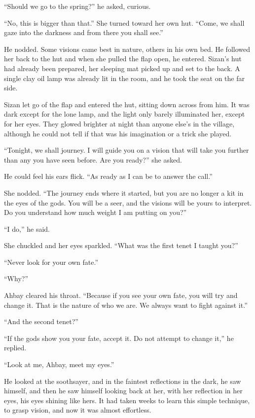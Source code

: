 ``Should we go to the spring?'' he asked, curious.

``No, this is bigger than that.'' She turned toward her own hut. ``Come, we shall gaze into the darkness and from there you shall see.''

He nodded. Some visions came best in nature, others in his own bed. He followed her back to the hut and when she pulled the flap open, he entered. Sizan's hut had already been prepared, her sleeping mat picked up and set to the back. A single clay oil lamp was already lit in the room, and he took the seat on the far side.

Sizan let go of the flap and entered the hut, sitting down across from him. It was dark except for the lone lamp, and the light only barely illuminated her, except for her eyes. They glowed brighter at night than anyone else's in the village, although he could not tell if that was his imagination or a trick she played.

``Tonight, we shall journey. I will guide you on a vision that will take you further than any you have seen before. Are you ready?'' she asked.

He could feel his ears flick. ``As ready as I can be to answer the call.''

She nodded. ``The journey ends where it started, but you are no longer a kit in the eyes of the gods. You will be a seer, and the visions will be yours to interpret. Do you understand how much weight I am putting on you?''

``I do,'' he said.

She chuckled and her eyes sparkled. ``What was the first tenet I taught you?''

``Never look for your own fate.''

``Why?''

Ahbay cleared his throat. ``Because if you see your own fate, you will try and change it. That is the nature of who we are. We always want to fight against it.''

``And the second tenet?''

``If the gods show you your fate, accept it. Do not attempt to change it,'' he replied.

``Look at me, Ahbay, meet my eyes.''

He looked at the soothsayer, and in the faintest reflections in the dark, he saw himself, and then he saw himself looking back at her, with her reflection in her eyes, his eyes shining like hers. It had taken weeks to learn this simple technique, to grasp vision, and now it was almost effortless.

